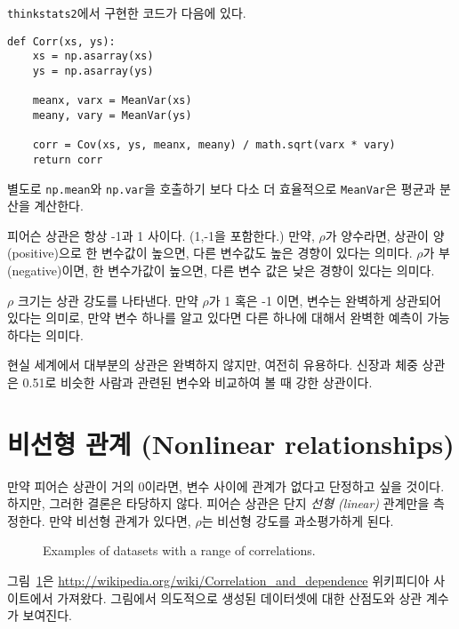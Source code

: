 
{\tt thinkstats2}에서 구현한 코드가 다음에 있다.

\begin{verbatim}
def Corr(xs, ys):
    xs = np.asarray(xs)
    ys = np.asarray(ys)

    meanx, varx = MeanVar(xs)
    meany, vary = MeanVar(ys)

    corr = Cov(xs, ys, meanx, meany) / math.sqrt(varx * vary)
    return corr
\end{verbatim}

별도로 {\tt np.mean}와 {\tt np.var}을 호출하기 보다 다소 더 효율적으로 {\tt MeanVar}은 평균과 분산을 계산한다.

피어슨 상관은 항상 -1과 1 사이다. (1,-1을 포함한다.) 만약, $\rho$가 양수라면, 상관이 양(positive)으로 한 변수값이 높으면, 다른 변수값도 높은 경향이 있다는 의미다. $\rho$가 부(negative)이면, 한 변수가값이 높으면, 다른 변수 값은 낮은 경향이 있다는 의미다.

$\rho$ 크기는 상관 강도를 나타낸다. 만약 $\rho$가 1 혹은 -1 이면, 변수는 완벽하게 상관되어 있다는 의미로, 만약 변수 하나를 알고 있다면 다른 하나에 대해서 완벽한 예측이 가능하다는 의미다.

현실 세계에서 대부분의 상관은 완벽하지 않지만, 여전히 유용하다.
신장과 체중 상관은 0.51로 비슷한 사람과 관련된 변수와 비교하여 볼 때 강한 상관이다.

\section{비선형 관계 (Nonlinear relationships)}

만약 피어슨 상관이 거의 0이라면, 변수 사이에 관계가 없다고 단정하고 싶을 것이다. 하지만, 그러한 결론은 타당하지 않다. 피어슨 상관은 단지 {\em
  선형 (linear)} 관계만을 측정한다. 만약 비선형 관계가 있다면, $\rho$는 비선형 강도를 과소평가하게 된다.


\begin{figure}
\caption{Examples of datasets with a range of correlations.}
\label{corr_examples}
\end{figure}

그림~\ref{corr_examples}은 \url{http://wikipedia.org/wiki/Correlation_and_dependence} 위키피디아 사이트에서 가져왔다.
그림에서 의도적으로 생성된 데이터셋에 대한 산점도와 상관 계수가 보여진다.

